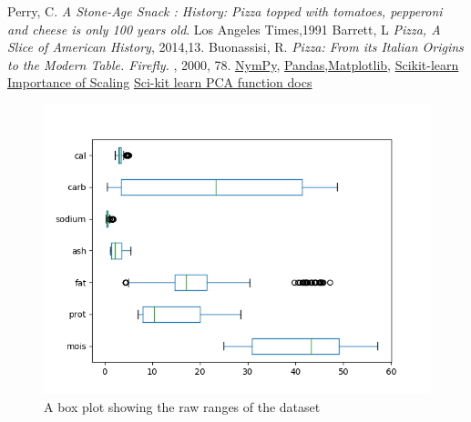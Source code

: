 \documentclass[preprint,12pt]{elsarticle}
\begin{document}

\begin{thebibliography}{00}
 Perry, C. {\em A Stone-Age Snack : History: Pizza topped with tomatoes, pepperoni and cheese is only 100 years old}. Los Angeles Times,1991
 Barrett, L  {\em Pizza, A Slice of American History}, 2014,13.
 Buonassisi, R. {\em Pizza: From its Italian Origins to the Modern Table. Firefly.} , 2000, 78.
 \href{https://numpy.org/}{NymPy}, \href{https://pandas.pydata.org/}{Pandas},\href{https://matplotlib.org/}{Matplotlib}, \href{https://scikit-learn.org/stable/index.html}{Scikit-learn}
 \href{https://scikit-learn.org/stable/auto_examples/preprocessing/plot_scaling_importance.html}{Importance of Scaling}
 \href{https://scikit-learn.org/stable/modules/generated/sklearn.decomposition.PCA.html}{Sci-kit learn PCA function docs}
\end{thebibliography}

\begin{figure}[b]
	\centering
    \centerline{\includegraphics[scale=0.6]{figs/raw_boxplot.png}}
    \caption{A box plot showing the raw ranges of the dataset}\label{fig:raw_boxplot}
\end{figure}
\end{document}
